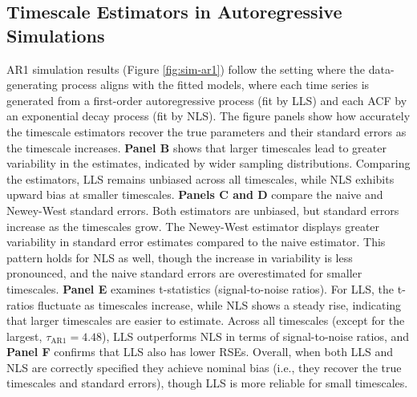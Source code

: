 \documentclass[latex/main.tex]{subfiles}
\begin{document}
\subsection{Timescale Estimators in Autoregressive Simulations}

AR1 simulation results (Figure \ref{fig:sim-ar1}) follow the setting where the data-generating process aligns with the fitted models, where each time series is generated from a first-order autoregressive process (fit by LLS) and each ACF by an exponential decay process (fit by NLS). The figure panels show how accurately the timescale estimators recover the true parameters and their standard errors as the timescale increases. \textbf{Panel B} shows that larger timescales lead to greater variability in the estimates, indicated by wider sampling distributions. Comparing the estimators, LLS remains unbiased across all timescales, while NLS exhibits upward bias at smaller timescales. \textbf{Panels C and D} compare the naive and Newey-West standard errors. Both estimators are unbiased, but standard errors increase as the timescales grow. The Newey-West estimator displays greater variability in standard error estimates compared to the naive estimator. This pattern holds for NLS as well, though the increase in variability is less pronounced, and the naive standard errors are overestimated for smaller timescales. \textbf{Panel E} examines t-statistics (signal-to-noise ratios). For LLS, the t-ratios fluctuate as timescales increase, while NLS shows a steady rise, indicating that larger timescales are easier to estimate. Across all timescales (except for the largest, $\tau_\text{AR1} = 4.48$), LLS outperforms NLS in terms of signal-to-noise ratios, and \textbf{Panel F} confirms that LLS also has lower RSEs. Overall, when both LLS and NLS are correctly specified they achieve nominal bias (i.e., they recover the true timescales and standard errors), though LLS is more reliable for small timescales.\\
\end{document}
